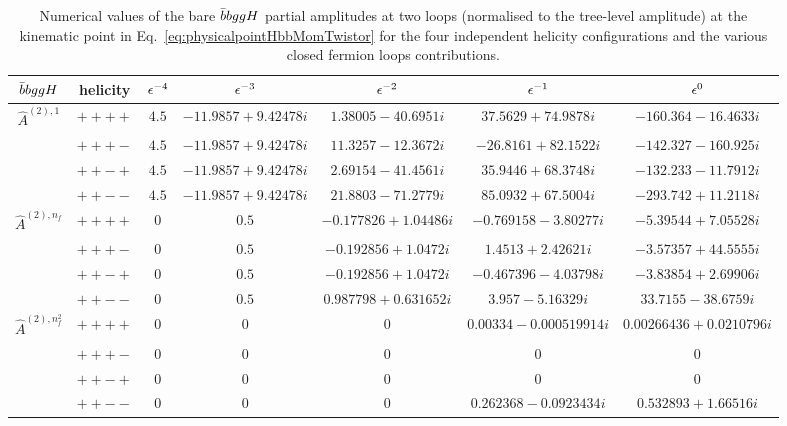 \documentclass[main.tex]{subfiles}
\begin{document}
\begin{table}[t!]
\centering
\begin{tabularx}{1.0\textwidth}{|C{0.7}|C{0.8}|C{0.6}|C{1.2}|C{1.2}|C{1.2}|C{1.3}|}
\hline
 $\bar{b}bggH$     & helicity & $\epsilon^{-4}$ & $\epsilon^{-3}$ & $\epsilon^{-2}$ & $\epsilon^{-1}$ & $\epsilon^{0}$ \\
\hline
$\hat A^{(2),1}$ & $++++$ & $ 4.5$ & $ -11.9857 + 9.42478 i$ & $ 1.38005 - 40.6951 i$ & $ 37.5629 + 74.9878 i$ & $ -160.364 - 16.4633 i $ \\
                 & $+++-$ & $ 4.5$ & $ -11.9857 + 9.42478 i$ & $ 11.3257 - 12.3672 i$ & $ -26.8161 + 82.1522 i$ & $ -142.327 - 160.925 i $ \\
                 & $++-+$ & $ 4.5$ & $ -11.9857 + 9.42478 i$ & $ 2.69154 - 41.4561 i$ & $ 35.9446 + 68.3748 i$ & $ -132.233 - 11.7912 i $ \\
                 & $++--$ & $ 4.5$ & $ -11.9857 + 9.42478 i$ & $ 21.8803 - 71.2779 i$ & $ 85.0932 + 67.5004 i$ & $ -293.742 + 11.2118 i $ \\
\hline
$\hat A^{(2),n_f}$  & $++++$ & $ 0$ & $ 0.5$ & $ -0.177826 + 1.04486 i$ & $ -0.769158 - 3.80277 i$ & $ -5.39544 + 7.05528 i $ \\
                    & $+++-$ & $ 0$ & $ 0.5$ & $ -0.192856 + 1.0472 i$ & $ 1.4513 + 2.42621 i$ & $ -3.57357 + 44.5555 i $ \\
                    & $++-+$ & $ 0$ & $ 0.5$ & $ -0.192856 + 1.0472 i$ & $ -0.467396 - 4.03798 i$ & $ -3.83854 + 2.69906 i $ \\
                    & $++--$ & $ 0$ & $ 0.5$ & $ 0.987798 + 0.631652 i$ & $ 3.957 - 5.16329 i$ & $ 33.7155 - 38.6759 i $ \\
\hline
$\hat A^{(2),n_f^2}$ & $++++$ & $ 0$ & $ 0$ & $ 0$ & $ 0.00334 - 0.000519914 i$ & $ 0.00266436 + 0.0210796 i $ \\
                     & $+++-$ & $ 0$ & $ 0$ & $ 0$ & $ 0$ & $ 0 $ \\
                     & $++-+$ & $ 0$ & $ 0$ & $ 0$ & $ 0$ & $ 0 $ \\
                     & $++--$ & $ 0$ & $ 0$ & $ 0$ & $ 0.262368 - 0.0923434 i$ & $ 0.532893 + 1.66516 i $ \\
\hline
\end{tabularx}
\caption{\label{tab:benchmark2g2bHbare} Numerical values of the bare $\bar{b}bggH$ partial amplitudes at two loops (normalised to the tree-level amplitude) at the kinematic point in Eq.~\eqref{eq:physicalpointHbbMomTwistor} for the four independent helicity configurations and the various closed fermion loops contributions.}
\end{table}
\end{document}
